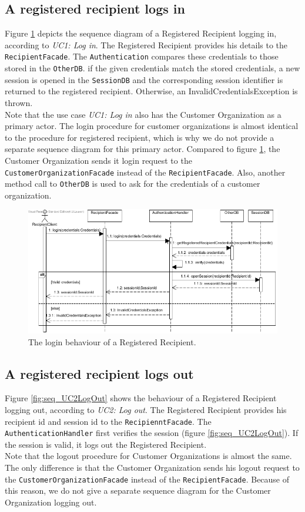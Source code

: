 \documentclass[a4paper,10pt]{article}
\begin{document}
\subsection{A registered recipient logs in}
Figure \ref{fig:seq_UC1LogIn} depicts the sequence diagram of a Registered Recipient logging in, according to \emph{UC1: Log in}. The Registered Recipient provides his details to the \texttt{RecipientFacade}. The \texttt{Authentication} compares these credentials to those stored in the \texttt{OtherDB}. if the given credentials match the stored credentials, a new session is opened in the \texttt{SessionDB} and the corresponding session identifier is returned to the registered recipient. Otherwise, an InvalidCredentialsException is thrown.\\
Note that the use case \emph{UC1: Log in} also has the Customer Organization as a primary actor. The login procedure for customer organizations is almost identical to the procedure for registered recipient, which is why we do not provide a separate sequence diagram for this primary actor. Compared to figure \ref{fig:seq_UC1LogIn}, the Customer Organization sends it login request to the \texttt{CustomerOrganizationFacade} instead of the \texttt{RecipientFacade}. Also, another method call to \texttt{OtherDB} is used to ask for the credentials of a customer organization.
\begin{figure}[!htp]
    \centering
    \includegraphics[width=\textwidth]{Seq_UC1LogIn.png}
    \caption{The login behaviour of a Registered Recipient.
        }\label{fig:seq_UC1LogIn}
\end{figure}

\subsection{A registered recipient logs out}
Figure \ref{fig:seq_UC2LogOut} shows the behaviour of a Registered Recipient logging out, according to \emph{UC2: Log out}. The Registered Recipient provides his recipient id and session id to the \texttt{RecipienntFacade}. The \texttt{AuthenticationHandler} first verifies the session (figure \ref{fig:seq_UC2LogOut}). If the session is valid, it logs out the Registered Recipient.\\ Note that the logout procedure for Customer Organizations is almost the same. The only difference is that the Customer Organization sends his logout request to the \texttt{CustomerOrganizationFacade} instead of the \texttt{RecipientFacade}. Because of this reason, we do not give a separate sequence diagram for the Customer Organization logging out.
\end{document}
